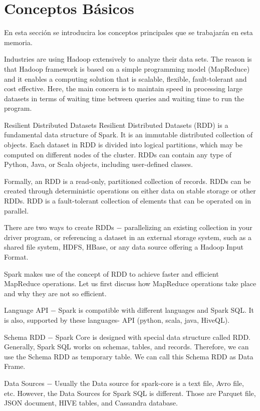 
\section{Conceptos Básicos}


En esta sección se introducira los conceptos principales que se trabajarán en esta memoria.



Industries are using Hadoop extensively to analyze their data sets. The reason is that Hadoop framework is based on a simple programming model (MapReduce) and it enables a computing solution that is scalable, flexible, fault-tolerant and cost effective. Here, the main concern is to maintain speed in processing large datasets in terms of waiting time between queries and waiting time to run the program.

Resilient Distributed Datasets
Resilient Distributed Datasets (RDD) is a fundamental data structure of Spark. It is an immutable distributed collection of objects. Each dataset in RDD is divided into logical partitions, which may be computed on different nodes of the cluster. RDDs can contain any type of Python, Java, or Scala objects, including user-defined classes.

Formally, an RDD is a read-only, partitioned collection of records. RDDs can be created through deterministic operations on either data on stable storage or other RDDs. RDD is a fault-tolerant collection of elements that can be operated on in parallel.

There are two ways to create RDDs − parallelizing an existing collection in your driver program, or referencing a dataset in an external storage system, such as a shared file system, HDFS, HBase, or any data source offering a Hadoop Input Format.

Spark makes use of the concept of RDD to achieve faster and efficient MapReduce operations. Let us first discuss how MapReduce operations take place and why they are not so efficient.



Language API − Spark is compatible with different languages and Spark SQL. It is also, supported by these languages- API (python, scala, java, HiveQL).

Schema RDD − Spark Core is designed with special data structure called RDD. Generally, Spark SQL works on schemas, tables, and records. Therefore, we can use the Schema RDD as temporary table. We can call this Schema RDD as Data Frame.

Data Sources − Usually the Data source for spark-core is a text file, Avro file, etc. However, the Data Sources for Spark SQL is different. Those are Parquet file, JSON document, HIVE tables, and Cassandra database.



